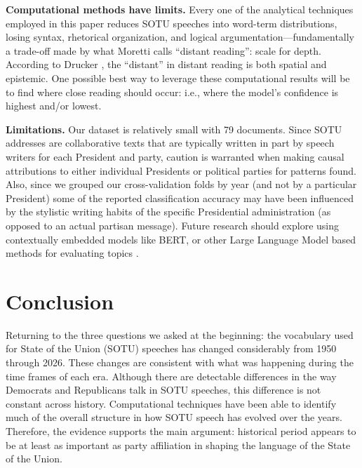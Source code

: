 \documentclass[11pt,twocolumn]{article}
\begin{document}
\textbf{Computational methods have limits.} Every one of the analytical techniques employed in this paper reduces SOTU speeches into word-term distributions, losing syntax, rhetorical organization, and logical argumentation---fundamentally a trade-off made by what Moretti \citeyearpar{moretti2013} calls ``distant reading'': scale for depth. According to Drucker \citeyearpar{drucker2017}, the ``distant'' in distant reading is both spatial and epistemic. One possible best way to leverage these computational results will be to find where close reading should occur: i.e., where the model's confidence is highest and/or lowest.

\textbf{Limitations.} Our dataset is relatively small with 79 documents. Since SOTU addresses are collaborative texts that are typically written in part by speech writers for each President and party, caution is warranted when making causal attributions to either individual Presidents or political parties for patterns found. Also, since we grouped our cross-validation folds by year (and not by a particular President) some of the reported classification accuracy may have been influenced by the stylistic writing habits of the specific Presidential administration (as opposed to an actual partisan message). Future research should explore using contextually embedded models like BERT, or other Large Language Model based methods for evaluating topics \citep{yang2024}.
\section{Conclusion}

Returning to the three questions we asked at the beginning: the vocabulary used for State of the Union (SOTU) speeches has changed considerably from 1950 through 2026. These changes are consistent with what was happening during the time frames of each era. Although there are detectable differences in the way Democrats and Republicans talk in SOTU speeches, this difference is not constant across history. Computational techniques have been able to identify much of the overall structure in how SOTU speech has evolved over the years. Therefore, the evidence supports the main argument: historical period appears to be at least as important as party affiliation in shaping the language of the State of the Union.


{\onecolumn
}
\end{document}
